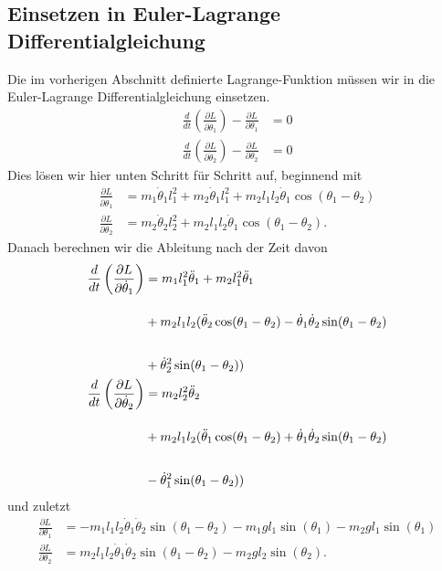 \subsection{Einsetzen in Euler-Lagrange Differentialgleichung}
Die im vorherigen Abschnitt definierte Lagrange-Funktion müssen wir in
die Euler-Lagrange Differentialgleichung einsetzen.
\begin{align}
    \label{eq:lag}
    \frac{d}{dt} \left(\frac{\partial L}{\partial \dot{\theta}_1}\right) 
    - \frac{\partial L}{\partial \theta_1} &= 0 \\
    \frac{d}{dt} \left(\frac{\partial L}{\partial \dot{\theta}_2}\right) 
    - \frac{\partial L}{\partial \theta_2} &= 0
\end{align}
Dies lösen wir hier unten Schritt für Schritt auf, beginnend mit
\begin{align}
    \frac{\partial L}{\partial \dot{\theta}_1} &= m_1 \dot{\theta}_1 l_1^2
    + m_2 \dot{\theta}_1 l_1^2 + m_2 l_1 l_2 \dot{\theta}_1
    \cos(\theta_1-\theta_2)\\
    \frac{\partial L}{\partial \dot{\theta}_2} &= m_2 \dot{\theta}_2 l_2^2
    + m_2 l_1 l_2 \dot{\theta}_1 \cos(\theta_1-\theta_2).
\end{align}
Danach berechnen wir die Ableitung nach der Zeit davon
\begin{align}
    \frac{d}{dt} \left(\frac{\partial L}{\partial \dot{\theta}_1}\right) &=
    m_1 l_1^2 \ddot{\theta}_1 + m_2 l_1^2 \ddot{\theta}_1 \\
    \shortintertext{}
    &+ m_2 l_1 l_2 (\ddot{\theta}_2\cos(\theta_1-\theta_2)-
    \dot{\theta}_1 \dot{\theta}_2 \sin(\theta_1-\theta_2) \nonumber \\
    \shortintertext{}
    &+ \dot{\theta}_2^2 \sin(\theta_1-\theta_2))
    \nonumber\\
    \frac{d}{dt} \left(\frac{\partial L}{\partial \dot{\theta}_2}\right) &=
    m_2 l_2^2 \ddot{\theta}_2\\
    \shortintertext{}
    &+ m_2 l_1 l_2 (\ddot{\theta}_1\cos(\theta_1-\theta_2)+
    \dot{\theta}_1 \dot{\theta}_2 \sin(\theta_1-\theta_2) \nonumber \\
    \shortintertext{}
    &- \dot{\theta}_1^2 \sin(\theta_1-\theta_2))
    \nonumber
\end{align}
und zuletzt
\begin{align}
    \frac{\partial L}{\partial {\theta}_1} &= -m_1 l_1 l_2 \dot{\theta}_1
    \dot{\theta}_2 \sin(\theta_1-\theta_2) - m_1 g l_1 \sin(\theta_1)
    - m_2 g l_1 \sin(\theta_1)\\
    \frac{\partial L}{\partial {\theta}_2} &= m_2 l_1 l_2 \dot{\theta}_1
    \dot{\theta}_2 \sin(\theta_1-\theta_2) - m_2 g l_2 \sin(\theta_2).
\end{align}
